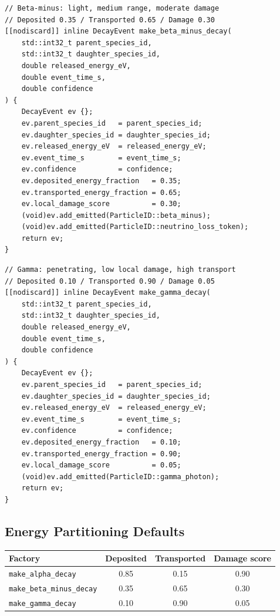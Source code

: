 \documentclass[11pt,a4paper]{article}
\begin{document}
\begin{lstlisting}[style=cpp20, caption={Beta-minus decay factory}]
// Beta-minus: light, medium range, moderate damage
// Deposited 0.35 / Transported 0.65 / Damage 0.30
[[nodiscard]] inline DecayEvent make_beta_minus_decay(
    std::int32_t parent_species_id,
    std::int32_t daughter_species_id,
    double released_energy_eV,
    double event_time_s,
    double confidence
) {
    DecayEvent ev {};
    ev.parent_species_id   = parent_species_id;
    ev.daughter_species_id = daughter_species_id;
    ev.released_energy_eV  = released_energy_eV;
    ev.event_time_s        = event_time_s;
    ev.confidence          = confidence;
    ev.deposited_energy_fraction   = 0.35;
    ev.transported_energy_fraction = 0.65;
    ev.local_damage_score          = 0.30;
    (void)ev.add_emitted(ParticleID::beta_minus);
    (void)ev.add_emitted(ParticleID::neutrino_loss_token);
    return ev;
}
\end{lstlisting}

\begin{lstlisting}[style=cpp20, caption={Gamma decay factory}]
// Gamma: penetrating, low local damage, high transport
// Deposited 0.10 / Transported 0.90 / Damage 0.05
[[nodiscard]] inline DecayEvent make_gamma_decay(
    std::int32_t parent_species_id,
    std::int32_t daughter_species_id,
    double released_energy_eV,
    double event_time_s,
    double confidence
) {
    DecayEvent ev {};
    ev.parent_species_id   = parent_species_id;
    ev.daughter_species_id = daughter_species_id;
    ev.released_energy_eV  = released_energy_eV;
    ev.event_time_s        = event_time_s;
    ev.confidence          = confidence;
    ev.deposited_energy_fraction   = 0.10;
    ev.transported_energy_fraction = 0.90;
    ev.local_damage_score          = 0.05;
    (void)ev.add_emitted(ParticleID::gamma_photon);
    return ev;
}
\end{lstlisting}

\subsection{Energy Partitioning Defaults}

\begin{center}
\begin{tabular}{lccc}
\toprule
\textbf{Factory} & \textbf{Deposited} & \textbf{Transported} & \textbf{Damage score} \\
\midrule
\texttt{make\_alpha\_decay}     & 0.85 & 0.15 & 0.90 \\
\texttt{make\_beta\_minus\_decay} & 0.35 & 0.65 & 0.30 \\
\texttt{make\_gamma\_decay}     & 0.10 & 0.90 & 0.05 \\
\bottomrule
\end{tabular}
\end{center}
\end{document}
